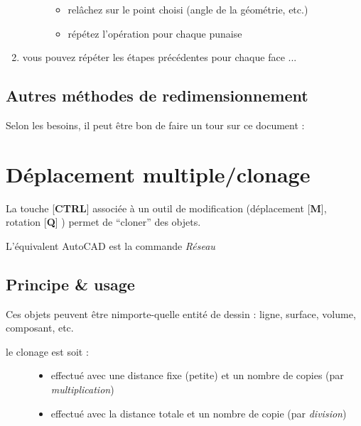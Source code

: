 \documentclass[a4paper,12pt,french]{sphinxmanual}
\begin{document}
\begin{enumerate}
\begin{description}
\begin{itemize}
\item {} 
relâchez sur le point choisi (angle de la géométrie, etc.)

\item {} 
répétez l'opération pour chaque punaise

\end{itemize}

\end{description}

\item {} 
vous pouvez répéter les étapes précédentes pour chaque face ...

\end{enumerate}


\subsection{Autres méthodes de redimensionnement}
\label{su/import-img-com-texture:autres-methodes-de-redimensionnement}
Selon les besoins, il peut être bon de faire un tour sur ce document : {\hyperref[su/redimensionnement\string-images\string-outil\string-mesure:redimensionnement\string-images\string-outil\string-mesure]{}}


\section{Déplacement multiple/clonage}
\label{su/clonage:deplcmt-multipl}\label{su/clonage::doc}\label{su/clonage:deplacement-multiple-clonage}
La touche {[}\textbf{CTRL}{]} associée à un outil de modification (déplacement {[}\textbf{M}{]}, rotation {[}\textbf{Q}{]} ) permet de ``cloner'' des objets.

L'équivalent AutoCAD est la commande \emph{Réseau}


\subsection{Principe \& usage}
\label{su/clonage:principe-usage}
Ces objets peuvent être nimporte-quelle entité de dessin : ligne, surface, volume, composant, etc.
\begin{description}
\item[{le clonage est soit :}] \leavevmode\begin{itemize}
\item {} 
effectué avec une distance fixe (petite) et un nombre de copies (par \emph{multiplication})

\item {} 
effectué avec la distance totale et un nombre de copie (par \emph{division})

\end{itemize}

\end{description}
\end{document}
